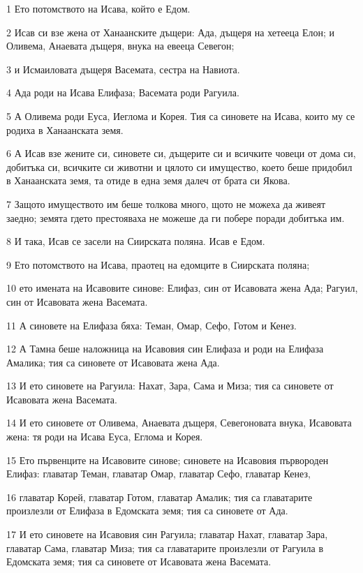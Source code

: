 \par 1 Ето потомството на Исава, който е Едом.
\par 2 Исав си взе жена от Ханаанските дъщери: Ада, дъщеря на хетееца Елон; и Оливема, Анаевата дъщеря, внука на евееца Севегон;
\par 3 и Исмаиловата дъщеря Васемата, сестра на Навиота.
\par 4 Ада роди на Исава Елифаза; Васемата роди Рагуила.
\par 5 А Оливема роди Еуса, Иеглома и Корея. Тия са синовете на Исава, които му се родиха в Ханаанската земя.
\par 6 А Исав взе жените си, синовете си, дъщерите си и всичките човеци от дома си, добитъка си, всичките си животни и цялото си имущество, което беше придобил в Ханаанската земя, та отиде в една земя далеч от брата си Якова.
\par 7 Защото имуществото им беше толкова много, щото не можеха да живеят заедно; земята гдето престояваха не можеше да ги побере поради добитъка им.
\par 8 И така, Исав се засели на Сиирската поляна. Исав е Едом.
\par 9 Ето потомството на Исава, праотец на едомците в Сиирската поляна;
\par 10 ето имената на Исавовите синове: Елифаз, син от Исавовата жена Ада; Рагуил, син от Исавовата жена Васемата.
\par 11 А синовете на Елифаза бяха: Теман, Омар, Сефо, Готом и Кенез.
\par 12 А Тамна беше наложница на Исавовия син Елифаза и роди на Елифаза Амалика; тия са синовете от Исавовата жена Ада.
\par 13 И ето синовете на Рагуила: Нахат, Зара, Сама и Миза; тия са синовете от Исавовата жена Васемата.
\par 14 И ето синовете от Оливема, Анаевата дъщеря, Севегоновата внука, Исавовата жена: тя роди на Исава Еуса, Еглома и Корея.
\par 15 Ето първенците на Исавовите синове; синовете на Исавовия първороден Елифаз: главатар Теман, главатар Омар, главатар Сефо, главатар Кенез,
\par 16 главатар Корей, главатар Готом, главатар Амалик; тия са главатарите произлезли от Елифаза в Едомската земя; тия са синовете от Ада.
\par 17 И ето синовете на Исавовия син Рагуила; главатар Нахат, главатар Зара, главатар Сама, главатар Миза; тия са главатарите произлезли от Рагуила в Едомската земя; тия са синовете от Исавовата жена Васемата.
